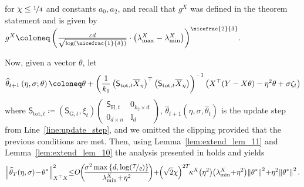 \documentclass[11pt]{article}
\theoremstyle{definition}
\theoremstyle{plain}
\providecommand{\lemmaref}[1]{Lemma~\ref{#1}}
\newcommand{\eps}{{\varepsilon}}
\providecommand{\brI}{\mathbb{I}}
\newcommand{\Norm}[1]{\left\| #1 \right\|}
\providecommand{\norm}[1]{\Norm{#1}}
\renewcommand{\eps}{\varepsilon}
\begin{document}
for $\chi \leq \nicefrac{1}{4}$ and constants $a_0, a_2$, and recall that $g^{X}$ was defined in the theorem statement and is given by $g^{X} \coloneq \left(\frac{\eps d}{\sqrt{\log(\nicefrac{1}{\delta})}}\cdot \left(\lambda^{X}_{\max} - \lambda^{X}_{\min}\right)\right)^{\nicefrac{2}{3}}$. 

Now, given a vector $\theta$, let
\begin{equation}
    \widehat{\theta}_{t + 1}\left(\eta,\sigma;\theta\right)\coloneq\theta+\left(\frac{1}{k_1}\left(\mathsf{S}_{\mathrm{tot}, t}\overline{X}_{\eta}\right)^{\top}\left(\mathsf{S}_{\mathrm{tot}, t}\overline{X}_{\eta}\right)\right)^{-1}\left(X^{\top}(Y-X\theta)-{\eta}^{2}\theta+\sigma\zeta_{t}\right)\hspace{-0.15em}
\end{equation}
where $\mathsf{S}_{\mathrm{tot}, t} \coloneq \left(\mathsf{S}_{\mathrm{G}, t}, \xi_t\right)\begin{pmatrix}
    \mathsf{S}_{\mathrm{H}, t} & 0_{k_2\times d}\\
    0_{d\times n} & \brI_d
\end{pmatrix}$, $\widehat{\theta}_{t+1}\left(\eta, \sigma, \widehat{\theta}_t\right)$
is the update step from Line~\ref {line:update_step}, and we omitted the clipping provided that the previous conditions are met. Then, using \lemmaref{lem:extend_lem_11} and \lemmaref{lem:extend_lem_10} the analysis presented in \citet[Appendix.~C, Step.~3]{lev2026near} holds and yields
\begin{equation}
    \label{eq:excess_empirical_risk_step1}
    \norm{\widehat{\theta}_{T}(\eta, \sigma) \hspace{-0.15em}-\hspace{-0.15em} \theta^{*}}^2_{X^{\top}X} \hspace{-0.25em}\leq\hspace{-0.25em} O\hspace{-0.25em}\left(\hspace{-0.2em}\frac{\sigma^2 \max\left\{d, \log(\nicefrac{T}{\varrho})\right\}}{\lambda^{X}_{\min} \hspace{-0.15em}+\hspace{-0.15em} \eta^2}\hspace{-0.2em}\right) \hspace{-0.25em}+\hspace{-0.25em} \left(\sqrt{2}\chi\right)^{2T}\hspace{-0.3em}\kappa^{X}\hspace{-0.2em}\left(\eta^2\right)\hspace{-0.2em}\left(\lambda^{X}_{\min} \hspace{-0.2em}+\hspace{-0.2em} \eta^2\right)\hspace{-0.15em}\norm{\theta^{*}}^2 \hspace{-0.2em}+\hspace{-0.2em} \eta^2 \hspace{-0.15em}\norm{\theta^{*}}^2. 
\end{equation}
\end{document}
